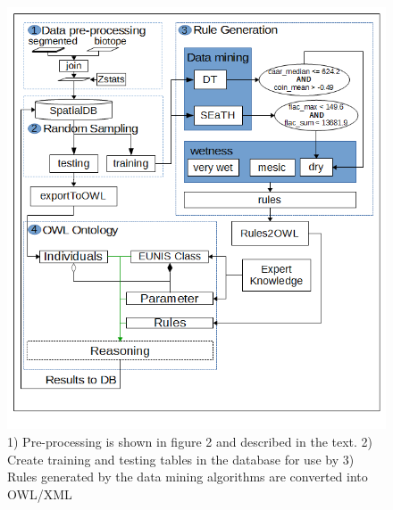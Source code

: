 \documentclass[authoryear, review,12pt,number]{elsarticle}
\begin{document}
\begin{figure}
    \includegraphics[width=1\linewidth]{diagrams/another_workflow_diagram_large.png}
    \caption
    {
        1) Pre-processing is  shown in figure 2 and described in
            the text.
        2) Create training and testing tables in the database for use by 3)  Rules
        generated by the data mining algorithms are converted into OWL/XML
    }
\label{fig_full_workflow}
\end{figure}
\end{document}
